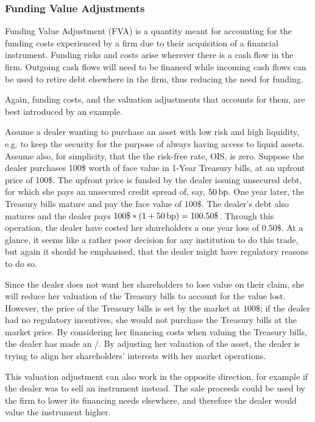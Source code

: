 \documentclass[main.tex]{subfiles}
\begin{document}
    \subsubsection{Funding Value Adjustments}
        Funding Value Adjustment (FVA) is a quantity meant for accounting for the funding costs 
        experienced by a firm due to their acquisition of a financial instrument.
        Funding risks and costs arise wherever there is a cash flow in the firm. 
        Outgoing cash flows will need to be financed while incoming cash flows
        can be used to retire debt elsewhere in the firm, thus reducing the need for funding.

        Again, funding costs, and the valuation adjustments that accounts for them,
        are best introduced by an example.

        \begin{example}
        Assume a dealer wanting to purchase an asset with low risk and high liquidity, 
        e.g. to keep the security for the purpose of always having access to liquid assets.
        Assume also, for simplicity, that the the risk-free rate, OIS, is zero.
        Suppose the dealer purchases 100\$ worth of face value in 1-Year Treasury bills,
        at an upfront price of 100\$. 
        The upfront price is funded by the dealer issuing unsecured debt, 
        for which she pays an unsecured credit spread of, say, $50\,\text{bp}$.
        One year later, the Treasury bills mature and pay the face value of $100\$$.
        The dealer's debt also matures and the dealer pays $100\$ * (1 + 50\basispoint) = 100.50\$$.
        Through this operation, the dealer have costed her shareholders a one year loss of $0.50\$$.
        At a glance, it seems like a rather poor decision for any institution to do this trade,
        but again it should be emphasised, that the dealer might have regulatory reasons to do so.

        Since the dealer does not want her shareholders to lose value on their claim,
        she will reduce her valuation of the Treasury bills to account for the value lost.
        However, the price of the Treasury bills is set by the market at $100\$$;
        if the dealer had no regulatory incentives, 
        she would not purchase the Treasury bills at the market price. 
        By considering her financing costs when valuing the Treasury bills, 
        the dealer has made an \FVA/.
        By adjusting her valuation of the asset, 
        the dealer is trying to align her shareholders' interests with her market operations.
        
        This valuation adjustment can also work in the opposite direction, 
        for example if the dealer was to sell an instrument instead.
        The sale proceeds could be used by the firm to lower its financing needs elsewhere,
        and therefore the dealer would value the instrument higher. 
        \end{example}
        
\end{document}
